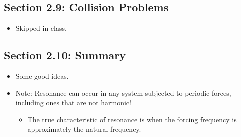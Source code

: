 \documentclass[../notes.tex]{subfiles}
\begin{document}
\subsection*{Section 2.9: Collision Problems}
\begin{itemize}
    \item Skipped in class.
\end{itemize}


\subsection*{Section 2.10: Summary}
\begin{itemize}
    \item Some good ideas.
    \item Note: Resonance can occur in any system subjected to periodic forces, including ones that are not harmonic!
    \begin{itemize}
        \item The true characteristic of resonance is when the forcing frequency is approximately the natural frequency.
    \end{itemize}
\end{itemize}
\end{document}
